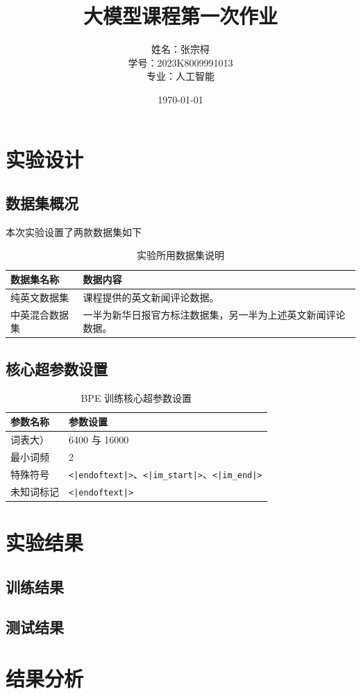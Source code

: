 \documentclass[a4paper,12pt]{ctexart} %
\title{\textbf{大模型课程第一次作业}}
\author{姓名：张宗桪 \\ 学号：2023K8009991013 \\ 专业：人工智能}
\date{\today}
\begin{document}
\pagestyle{plain} %

\maketitle
\thispagestyle{empty} %
\newpage

\tableofcontents
\newpage
\section{实验设计}


\subsection{数据集概况}
本次实验设置了两款数据集如下

\begin{table}[H]
    \centering
    \caption{实验所用数据集说明}
    \begin{tabular}{p{} p{}}
        \toprule
        数据集名称 & 数据内容 \\
        \midrule
        纯英文数据集 & 课程提供的英文新闻评论数据。 \\
        中英混合数据集 & 一半为新华日报官方标注数据集，另一半为上述英文新闻评论数据。 \\
        \bottomrule
    \end{tabular}
\end{table}

\subsection{核心超参数设置}

\begin{table}[H]
    \centering
    \caption{BPE 训练核心超参数设置}
    \begin{tabular}{p{} p{}}
        \toprule
        参数名称 & 参数设置 \\
        \midrule
        词表大） & 6400 与 16000 \\
        最小词频 & 2 \\
        特殊符号 & \texttt{<|endoftext|>}、\texttt{<|im\_start|>}、\texttt{<|im\_end|>} \\
        未知词标记 & \texttt{<|endoftext|>} \\

        \bottomrule
    \end{tabular}
\end{table}


\section{实验结果}


\subsection{训练结果}


\subsection{测试结果}


\section{结果分析}
\end{document}
